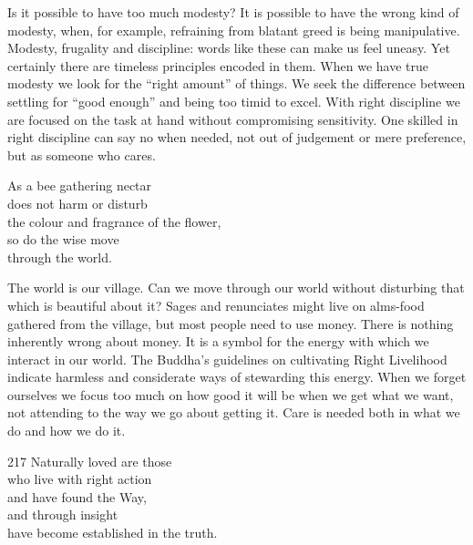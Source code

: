 \begin{dhpRefl}

Is it possible to have too much modesty? It is possible to have the
wrong kind of modesty, when, for example, refraining from blatant
greed is being manipulative. Modesty, frugality and discipline: words
like these can make us feel uneasy. Yet certainly there are timeless
principles encoded in them. When we have true modesty we look for the
``right amount'' of things. We seek the difference between settling for
``good enough'' and being too timid to excel. With right discipline we
are focused on the task at hand without compromising sensitivity.
One skilled in right discipline can say no when needed, not out of
judgement or mere preference, but as someone who cares.

\end{dhpRefl}


\begin{dhpVerse}{49}
\label{dhp-49}
As a bee gathering nectar\\
does not harm or disturb\\
the colour and fragrance of the flower,\\
so do the wise move\\
through the world.
\end{dhpVerse}

\begin{dhpRefl}

The world is our village. Can we move through our world without
disturbing that which is beautiful about it? Sages and renunciates
might live on alms-food gathered from the village, but most people
need to use money. There is nothing inherently wrong about money. It
is a symbol for the energy with which we interact in our world. The
Buddha's guidelines on cultivating Right Livelihood indicate harmless
and considerate ways of stewarding this energy. When we forget
ourselves we focus too much on how good it will be when we get what
we want, not attending to the way we go about getting it. Care is
needed both in what we do and how we do it.

\end{dhpRefl}


\begin{dhpVerse}{217}
\label{dhp-217}
Naturally loved are those\\
who live with right action\\
and have found the Way,\\
and through insight\\
have become established in the truth.
\end{dhpVerse}

